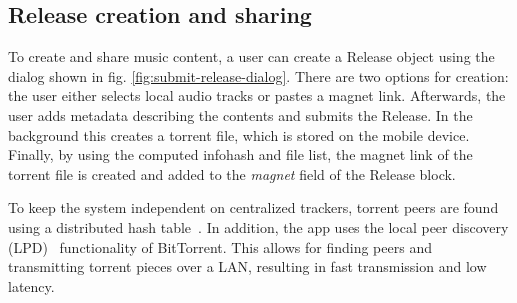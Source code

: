 \subsection{Release creation and sharing}
\label{sec:torrent-creation}
To create and share music content, a user can create a Release object using the dialog shown in fig. \ref{fig:submit-release-dialog}.  There are two options for creation: the user either selects local audio tracks or pastes a magnet link. Afterwards, the user adds metadata describing the contents and submits the Release. In the background this creates a torrent file, which is stored on the mobile device. Finally, by using the computed infohash and file list, the magnet link of the torrent file is created and added to the \textit{magnet} field of the Release block.

To keep the system independent on centralized trackers, torrent peers are found using a distributed hash table~\citep{dht2019}. In addition, the app uses the local peer discovery (LPD)~\citep{bittorrentbep142015} functionality of BitTorrent. This allows for finding peers and transmitting torrent pieces over a LAN, resulting in fast transmission and low latency.

